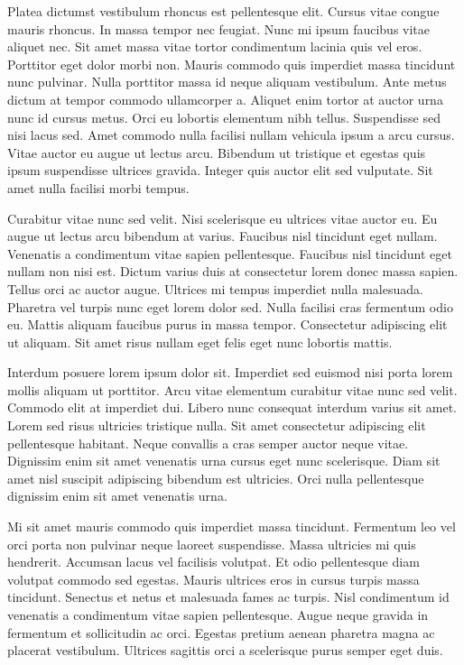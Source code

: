 \documentclass[11pt,a4paper]{article}
\begin{document}
Platea dictumst vestibulum rhoncus est pellentesque elit. Cursus vitae congue mauris rhoncus. In massa tempor nec feugiat. Nunc mi ipsum faucibus vitae aliquet nec. Sit amet massa vitae tortor condimentum lacinia quis vel eros. Porttitor eget dolor morbi non. Mauris commodo quis imperdiet massa tincidunt nunc pulvinar. Nulla porttitor massa id neque aliquam vestibulum. Ante metus dictum at tempor commodo ullamcorper a. Aliquet enim tortor at auctor urna nunc id cursus metus. Orci eu lobortis elementum nibh tellus. Suspendisse sed nisi lacus sed. Amet commodo nulla facilisi nullam vehicula ipsum a arcu cursus. Vitae auctor eu augue ut lectus arcu. Bibendum ut tristique et egestas quis ipsum suspendisse ultrices gravida. Integer quis auctor elit sed vulputate. Sit amet nulla facilisi morbi tempus.

Curabitur vitae nunc sed velit. Nisi scelerisque eu ultrices vitae auctor eu. Eu augue ut lectus arcu bibendum at varius. Faucibus nisl tincidunt eget nullam. Venenatis a condimentum vitae sapien pellentesque. Faucibus nisl tincidunt eget nullam non nisi est. Dictum varius duis at consectetur lorem donec massa sapien. Tellus orci ac auctor augue. Ultrices mi tempus imperdiet nulla malesuada. Pharetra vel turpis nunc eget lorem dolor sed. Nulla facilisi cras fermentum odio eu. Mattis aliquam faucibus purus in massa tempor. Consectetur adipiscing elit ut aliquam. Sit amet risus nullam eget felis eget nunc lobortis mattis.

Interdum posuere lorem ipsum dolor sit. Imperdiet sed euismod nisi porta lorem mollis aliquam ut porttitor. Arcu vitae elementum curabitur vitae nunc sed velit. Commodo elit at imperdiet dui. Libero nunc consequat interdum varius sit amet. Lorem sed risus ultricies tristique nulla. Sit amet consectetur adipiscing elit pellentesque habitant. Neque convallis a cras semper auctor neque vitae. Dignissim enim sit amet venenatis urna cursus eget nunc scelerisque. Diam sit amet nisl suscipit adipiscing bibendum est ultricies. Orci nulla pellentesque dignissim enim sit amet venenatis urna.

Mi sit amet mauris commodo quis imperdiet massa tincidunt. Fermentum leo vel orci porta non pulvinar neque laoreet suspendisse. Massa ultricies mi quis hendrerit. Accumsan lacus vel facilisis volutpat. Et odio pellentesque diam volutpat commodo sed egestas. Mauris ultrices eros in cursus turpis massa tincidunt. Senectus et netus et malesuada fames ac turpis. Nisl condimentum id venenatis a condimentum vitae sapien pellentesque. Augue neque gravida in fermentum et sollicitudin ac orci. Egestas pretium aenean pharetra magna ac placerat vestibulum. Ultrices sagittis orci a scelerisque purus semper eget duis.
\end{document}
